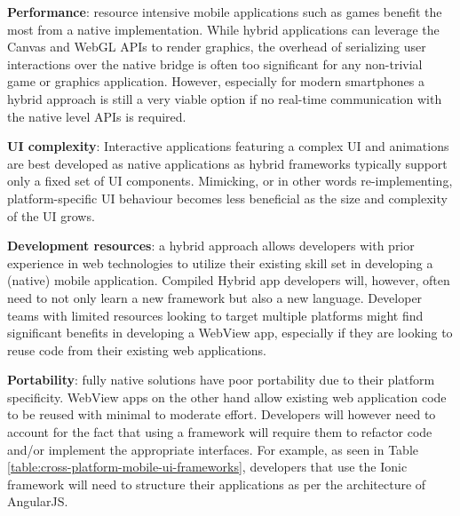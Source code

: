 \documentclass[thesis.tex]{subfiles}
\begin{document}
\begin{itemize}

	\begin{item}
	\textbf{Performance}: resource intensive mobile applications such as games benefit the most from a native implementation. While hybrid applications can leverage the Canvas and WebGL APIs to render graphics, the overhead of serializing user interactions over the native bridge is often too significant for any non-trivial game or graphics application. However, especially for modern smartphones a hybrid approach is still a very viable option if no real-time communication with the native level APIs is required.
	\end{item}

	\begin{item}
	\textbf{UI complexity}: Interactive applications featuring a complex UI and animations are best developed as native applications as hybrid frameworks typically support only a fixed set of UI components. Mimicking, or in other words re-implementing, platform-specific UI behaviour becomes less beneficial as the size and complexity of the UI grows.
	\end{item}

	\begin{item}
	\textbf{Development resources}: a hybrid approach allows developers with prior experience in web technologies to utilize their existing skill set in developing a (native) mobile application. Compiled Hybrid app developers will, however, often need to not only learn a new framework but also a new language. Developer teams with limited resources looking to target multiple platforms might find significant benefits in developing a WebView app, especially if they are looking to reuse code from their existing web applications.
	\end{item}

	\begin{item}
	\textbf{Portability}: fully native solutions have poor portability due to their platform specificity. WebView apps on the other hand allow existing web application code to be reused with minimal to moderate effort. Developers will however need to account for the fact that using a framework will require them to refactor code and/or implement the appropriate interfaces. For example, as seen in Table \ref{table:cross-platform-mobile-ui-frameworks}, developers that use the Ionic framework will need to structure their applications as per the architecture of AngularJS.
	\end{item}

\end{itemize}
\end{document}
